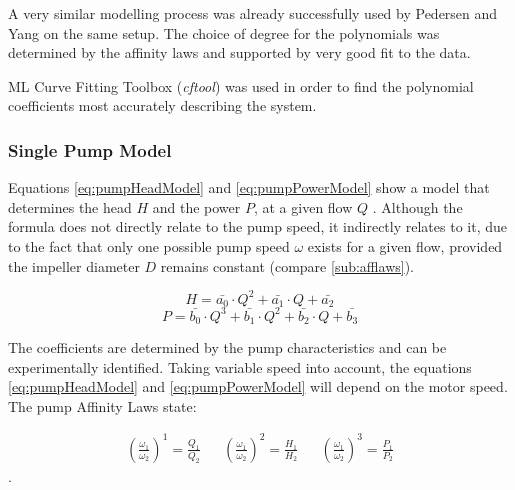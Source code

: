 A very similar modelling process was already successfully used by Pedersen and Yang 
\cite{YangMultiPump2008} on the same setup.
The choice of degree for the polynomials was determined by the affinity laws \cite{Volk2014}
and supported by very good fit to the data.

ML Curve Fitting Toolbox (\textit{cftool}) \cite{cftool}
was used in order to find the polynomial coefficients most accurately describing the system.

\subsubsection{Single Pump Model}
Equations \ref{eq:pumpHeadModel} and \ref{eq:pumpPowerModel} show a model that 
determines the head $H$ and the power $P$,
at a given flow $Q$ \cite{Yang2010}. 
Although the formula does not directly relate to the pump speed, it indirectly relates to it,
due to the fact that only one possible pump speed $\omega$ exists for a given flow,
provided the impeller diameter $D$ remains constant (compare \ref{sub:afflaws}).


\begin{equation}
	H = \bar{a_{0}} \cdot Q^2 + \bar{a_{1}} \cdot Q + \bar{a_{2}}
	\label{eq:pumpHeadModel}
\end{equation}
\begin{equation}
	P = \bar{b_{0}} \cdot Q^3 + \bar{b_{1}} \cdot Q^2 + \bar{b_{2}} \cdot Q + \bar{b_{3}}
	\label{eq:pumpPowerModel}
\end{equation}

The coefficients are determined by the pump characteristics and can be experimentally identified.
Taking variable speed into account, the equations \ref{eq:pumpHeadModel}  and \ref{eq:pumpPowerModel}
will depend on the motor speed\cite{Yang2010}. The pump Affinity Laws state:

\begin{align*}
	\left(\frac{\omega_1}{\omega_2}\right)^1 = \frac{Q_1}{Q_2} && 
	\left(\frac{\omega_1}{\omega_2}\right)^2 = \frac{H_1}{H_2} &&
	\left(\frac{\omega_1}{\omega_2}\right)^3 = \frac{P_1}{P_2}		
\end{align*}\cite{Volk2014}.

